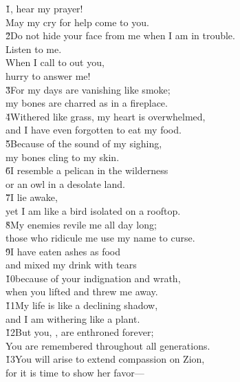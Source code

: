 \begin{poetry}
\poeml \v{1}, hear my prayer! \\
\poemll    May my cry for help come to you. \\
\poeml \v{2}Do not hide your face from me when I am in trouble. \\
\poemll    Listen to me. \\
\poeml When I call to out you, \\
\poemll    hurry to answer me! \\
\poeml \v{3}For my days are vanishing like smoke; \\
\poemll    my bones are charred as in a fireplace. \\
\poeml \v{4}Withered like grass, my heart is overwhelmed, \\
\poemll    and I have even forgotten to eat my food. \\
\poeml \v{5}Because of the sound of my sighing, \\
\poemll    my bones cling to my skin. \\
\poeml \v{6}I resemble a pelican in the wilderness \\
\poemll    or an owl in a desolate land. \\
\poeml \v{7}I lie awake, \\
\poemll    yet I am like a bird isolated on a rooftop. \\
\poeml \v{8}My enemies revile me all day long; \\
\poemll    those who ridicule me use my name to curse. \\
\poeml \v{9}I have eaten ashes as food \\
\poemll    and mixed my drink with tears \\
\poeml \v{10}because of your indignation and wrath, \\
\poemll    when you lifted and threw me away. \\
\poeml \v{11}My life is like a declining shadow, \\
\poemll    and I am withering like a plant. \\
\poeml \v{12}But you, , are enthroned forever; \\
\poemll    You are remembered throughout all generations. \\
\poeml \v{13}You will arise to extend compassion on Zion, \\
\poemll    for it is time to show her favor--- \\

\end{poetry}
